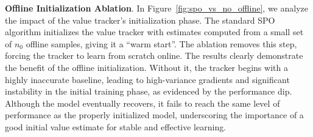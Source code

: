 \textbf{Offline Initialization Ablation}. In Figure~\ref{fig:spo_vs_no_offline}, we analyze the impact of the value tracker's initialization phase. The standard SPO algorithm initializes the value tracker with estimates computed from a small set of $n_0$ offline samples, giving it a ``warm start''. The ablation removes this step, forcing the tracker to learn from scratch online. The results clearly demonstrate the benefit of the offline initialization. Without it, the tracker begins with a highly inaccurate baseline, leading to high-variance gradients and significant instability in the initial training phase, as evidenced by the performance dip. Although the model eventually recovers, it fails to reach the same level of performance as the properly initialized model, underscoring the importance of a good initial value estimate for stable and effective learning.
